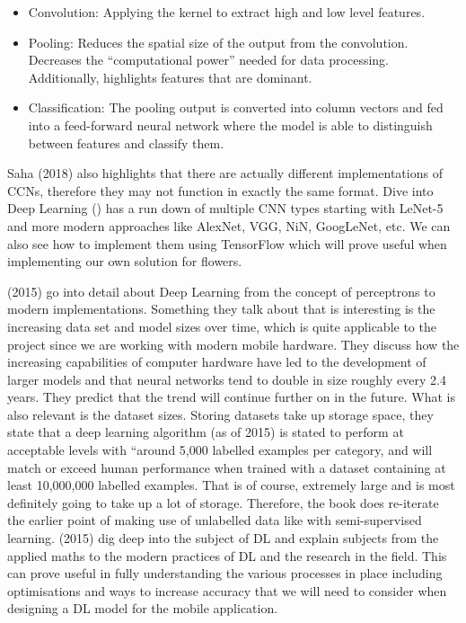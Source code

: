\documentclass{article}
\begin{document}
\begin{itemize}
    \item Convolution: Applying the kernel to extract high and low level features.
    \item Pooling: Reduces the spatial size of the output from the convolution. Decreases the “computational power” 
    needed for data processing. Additionally, highlights features that are dominant.
    \item Classification: The pooling output is converted into column vectors and fed into a feed-forward neural 
    network where the model is able to distinguish between features and classify them.
\end{itemize}

Saha (2018) also highlights that there are actually different implementations of CCNs, therefore they may not function 
in exactly the same format. Dive into Deep Learning (\cite{diveintodeeplearning}) has a run down of multiple CNN types 
starting with LeNet-5 and more modern approaches like AlexNet, VGG, NiN, GoogLeNet, etc. We can also see how to 
implement them using TensorFlow which will prove useful when implementing our own solution for flowers.

\citeauthor{goodfellow2016deep} (2015) go into detail about Deep Learning from the concept of perceptrons to modern 
implementations. Something they talk about that is interesting is the increasing data set and model sizes over time, 
which is quite applicable to the project since we are working with modern mobile hardware. They discuss how the 
increasing capabilities of computer hardware have led to the development of larger models and that neural networks tend 
to double in size roughly every 2.4 years. They predict that the trend will continue further on in the future. What is 
also relevant is the dataset sizes. Storing datasets take up storage space, they state that a deep learning algorithm 
(as of 2015) is stated to perform at acceptable levels with “around 5,000 labelled examples per category, and will match
or exceed human performance when trained with a dataset containing at least 10,000,000 labelled examples. That is of 
course, extremely large and is most definitely going to take up a lot of storage. Therefore, the book does re-iterate 
the earlier point of making use of unlabelled data like with semi-supervised learning. \citeauthor{goodfellow2016deep}
(2015) dig deep into the subject of DL and explain subjects from the applied maths to the modern practices of DL and 
the research in the field. This can prove useful in fully understanding the various processes in place including 
optimisations and ways to increase accuracy that we will need to consider when designing a DL model for the mobile 
application.
\end{document}
